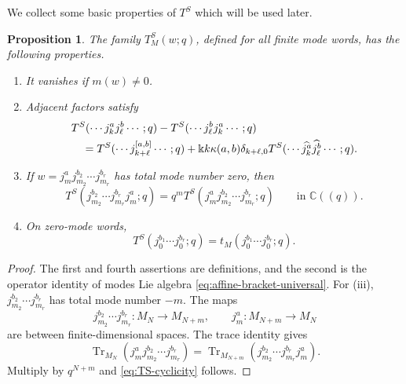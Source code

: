 \documentclass[11pt,a4paper]{amsart}
\numberwithin{equation}{section}
\newtheorem{proposition}[theorem]{Proposition}
\theoremstyle{definition}
\theoremstyle{remark}
\DeclareMathOperator{\Tr}{Tr}
\newcommand{\CC}{\mathbb C}
\newcommand{\kk}{\Bbbk}
\begin{document}
We collect some basic properties of $T^S$ which will be used later.
\begin{proposition}
\label{prop:TS-relations}
The family $T^S_M(w;q)$, defined for all finite mode words, has the
following properties.
\begin{enumerate}[label=\textup{(\roman*)},leftmargin=2.7em]
 \item It vanishes if $m(w)\neq0$.
 \item Adjacent factors satisfy
 \begin{align}
 &T^S(\cdots j_k^a j_\ell^b\cdots;q)
 -T^S(\cdots j_\ell^b j_k^a\cdots;q)\notag\\
 &\quad=T^S(\cdots j_{k+\ell}^{[a,b]}\cdots;q)
 +\kk k\kappa(a,b)\delta_{k+\ell,0}
 T^S(\cdots\widehat{j_k^a}\widehat{j_\ell^b}\cdots;q).
 \label{eq:TS-exchange}
 \end{align}
 \item If $w=j_m^a j_{m_2}^{b_2}\cdots j_{m_r}^{b_r}$ has total mode number zero, then
 \begin{equation}
  T^S(j_{m_2}^{b_2}\cdots j_{m_r}^{b_r}j_m^a;q)
  =q^mT^S(j_m^a j_{m_2}^{b_2}\cdots j_{m_r}^{b_r};q)
  \qquad\text{in }\CC((q)).
  \label{eq:TS-cyclicity}
 \end{equation}
 \item On zero-mode words,
 \begin{equation}
  T^S(j_0^{b_1}\cdots j_0^{b_r};q)
  =t_M(j_0^{b_1}\cdots j_0^{b_r};q).
  \label{eq:TS-zero-data}
 \end{equation}
\end{enumerate}
\end{proposition}

\begin{proof}
The first and fourth assertions are definitions, and the second is the
operator identity of modes Lie algebra \eqref{eq:affine-bracket-universal}.  For (iii), $j_{m_2}^{b_2}\cdots j_{m_r}^{b_r}$ has total mode number $-m$.
The maps
\begin{equation*}
 j_{m_2}^{b_2}\cdots j_{m_r}^{b_r}:M_N\longrightarrow M_{N+m},\qquad
 j_m^a:M_{N+m}\longrightarrow M_N
\end{equation*}
are between finite-dimensional spaces.  The trace identity gives
\begin{equation*}
 \Tr_{M_N}(j_m^a j_{m_2}^{b_2}\cdots j_{m_r}^{b_r})
 =\Tr_{M_{N+m}}(j_{m_2}^{b_2}\cdots j_{m_r}^{b_r}j_m^a).
\end{equation*}
Multiply by $q^{N+m}$ and \eqref{eq:TS-cyclicity} follows.
\end{proof}
\end{document}

